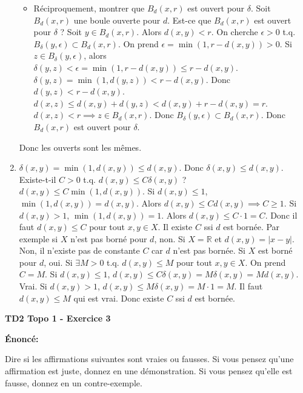 \documentclass[oneside]{book}
\begin{document}
\begin{solution}
\begin{enumerate}
\begin{itemize}
        \item Réciproquement, montrer que $B_d(x, r)$ est ouvert pour $\delta$.
              Soit $B_d(x, r)$ une boule ouverte pour $d$. Est-ce que $B_d(x, r)$ est ouvert pour $\delta$ ?
              Soit $y \in B_d(x, r)$. Alors $d(x, y) < r$. On cherche $\epsilon > 0$ t.q. $B_\delta(y, \epsilon) \subset B_d(x, r)$.
              On prend $\epsilon = \min(1, r - d(x, y)) > 0$.
              Si $z \in B_\delta(y, \epsilon)$, alors $\delta(y, z) < \epsilon = \min(1, r - d(x, y)) \leq r - d(x, y)$.
              $\delta(y, z) = \min(1, d(y, z)) < r - d(x, y)$.
              Donc $d(y, z) < r - d(x, y)$.
              $d(x, z) \leq d(x, y) + d(y, z) < d(x, y) + r - d(x, y) = r$.
              $d(x, z) < r \implies z \in B_d(x, r)$.
              Donc $B_\delta(y, \epsilon) \subset B_d(x, r)$. Donc $B_d(x, r)$ est ouvert pour $\delta$.

    \end{itemize}
    Donc les ouverts sont les mêmes.

    \item $\delta(x, y) = \min(1, d(x, y)) \leq d(x, y)$. Donc $\delta(x, y) \leq d(x, y)$.
    Existe-t-il $C > 0$ t.q. $d(x, y) \leq C \delta(x, y)$ ?
    $d(x, y) \leq C \min(1, d(x, y))$.
    Si $d(x, y) \leq 1$, $\min(1, d(x, y)) = d(x, y)$. Alors $d(x, y) \leq C d(x, y) \implies C \geq 1$.
    Si $d(x, y) > 1$, $\min(1, d(x, y)) = 1$. Alors $d(x, y) \leq C \cdot 1 = C$.
    Donc il faut $d(x, y) \leq C$ pour tout $x, y \in X$.
    Il existe $C$ ssi $d$ est bornée.
    Par exemple si $X$ n'est pas borné pour $d$, non. Si $X = \mathbb{R}$ et $d(x, y) = |x - y|$.
    Non, il n'existe pas de constante $C$ car $d$ n'est pas bornée.
    Si $X$ est borné pour $d$, oui. Si $\exists M > 0$ t.q. $d(x, y) \leq M$ pour tout $x, y \in X$.
    On prend $C = M$. Si $d(x, y) \leq 1$, $d(x, y) \leq C \delta(x, y) = M \delta(x, y) = M d(x, y)$. Vrai.
    Si $d(x, y) > 1$, $d(x, y) \leq M \delta(x, y) = M \cdot 1 = M$. Il faut $d(x, y) \leq M$ qui est vrai.
    Donc existe $C$ ssi $d$ est bornée.
\end{enumerate}
\end{solution}

\textbf{TD2 Topo 1 - Exercice 3}

\textbf{Énoncé:}

Dire si les affirmations suivantes sont vraies ou fausses. Si vous pensez qu'une affirmation est juste, donnez en une démonstration. Si vous pensez qu'elle est fausse, donnez en un contre-exemple.
\end{document}
